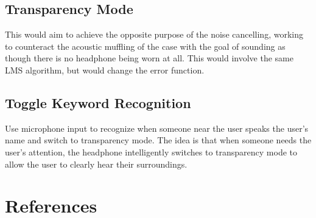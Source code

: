 \documentclass{fpgairpods}
\begin{document}
\begin{multicols*}{2}
\subsection{Transparency Mode}
This would aim to achieve the opposite purpose of the noise cancelling, working to counteract the acoustic muffling of the case with the goal of sounding as though there is no headphone being worn at all. This would involve the same LMS algorithm, but would change the error function.

\subsection{Toggle Keyword Recognition}
Use microphone input to recognize when someone near the user speaks the user's name and switch to transparency mode. The idea is that when someone needs the user's attention, the headphone intelligently switches to transparency mode to allow the user to clearly hear their surroundings.

\section{References}
\vspace{-7mm}
\printbibliography

\end{multicols*}
\end{document}
